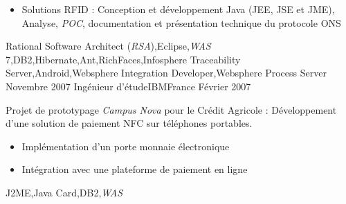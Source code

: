 \begin{experiences}
{\begin{itemize}
                        \begin{itemize}
                          \item Conception et développement JEE
                          \item Définition et implémentation des processus métiers et médiations
                        \end{itemize}
                        \item Solutions RFID : Conception et développement Java (JEE, JSE et JME), Analyse, \emph{POC}, documentation et présentation technique du protocole ONS
                      \end{itemize}
                    }
                    {Rational Software Architect (\emph{RSA}),Eclipse,\emph{WAS} 7,DB2,Hibernate,Ant,RichFaces,Infosphere Traceability Server,Android,Websphere Integration Developer,Websphere Process Server}
  \emptySeparator
  \experience
  {Novembre 2007}  {Ingénieur d'étude}{IBM}{France}
  {Février 2007}   {
                      Projet de prototypage \emph{Campus Nova} pour le Crédit Agricole : Développement d'une solution de paiement NFC sur téléphones portables.
                      \begin{itemize}
                        \item Implémentation d'un porte monnaie électronique
                        \item Intégration avec une plateforme de paiement en ligne
                      \end{itemize}
                  }
                  {J2ME,Java Card,DB2,\emph{WAS}}
\end{experiences}
